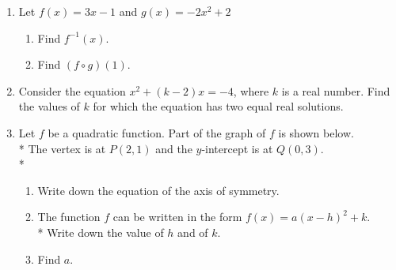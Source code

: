 \documentclass[]{book}
\begin{document}
\begin{enumerate}
\item Let $f(x)=3x-1$ and $g(x)=-2x^2+2$
\begin{enumerate}
    \item Find $f^{-1}(x)$.
    \item Find $(f \circ g)(1)$.
\end{enumerate}

\item Consider the equation $x^2 + (k-2)x=-4$, where $k$ is a real number. Find the values of $k$ for which the equation has two equal real solutions.

\item Let $f$ be a quadratic function. Part of the graph of $f$ is shown below.\\*
The vertex is at $P(2,1)$ and the $y$-intercept is at $Q(0, 3)$.\\*

\begin{figure}[!htbp]
\begin{center}
\end{center}
\end{figure}

\begin{enumerate}
    \item Write down the equation of the axis of symmetry.
    \item The function $f$ can be written in the form $f(x)=a(x-h)^2 +k$. \\*
    Write down the value of $h$ and of $k$.
    \item Find $a$.
\end{enumerate}


\end{enumerate}
\end{document}
